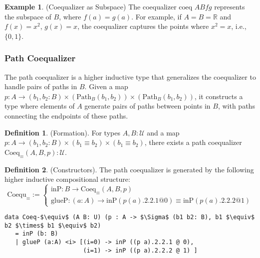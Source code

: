 \documentclass{article}
\theoremstyle{definition}
\newtheorem{definition}{Definition}
\newtheorem{example}{Example}
\begin{document}
\begin{example} (Coequalizer as Subspace)
The coequalizer \( \text{coeq } A B f g \) represents the subspace
of \( B \), where \( f(a) = g(a) \). For example, if \( A = B = \mathbb{R} \)
and \( f(x) = x^2 \), \( g(x) = x \), the coequalizer captures the points
where \( x^2 = x \), i.e., \( \{0, 1\} \).
\end{example}

\newpage
\subsubsection*{Path Coequalizer}
The path coequalizer is a higher inductive type that generalizes
the coequalizer to handle pairs of paths in \( B \). Given
a map \( p : A \to (b_1, b_2 : B) \times (\text{Path}_B (b_1, b_2)) \times (\text{Path}_B (b_1, b_2)) \),
it constructs a type where elements of \( A \) generate pairs
of paths between points in \( B \), with paths connecting
the endpoints of these paths.

\begin{definition} (Formation).
For types \( A, B : \mathcal{U} \) and a map \( p : A \to (b_1, b_2 : B) \times (b_1 \equiv b_2) \times (b_1 \equiv b_2) \),
there exists a path coequalizer \( \text{Coeq}_\equiv(A,B,p) : \mathcal{U} \).
\end{definition}

\begin{definition} (Constructors).
The path coequalizer is generated by the following higher inductive compositional structure:
\[
\text{Coequ}_\equiv :=
\begin{cases}
\text{inP} : B \to \text{Coeq}_\equiv(A,B,p) \\
\text{glueP} : (a : A) \to \text{inP}(p(a).2.2.1 @ 0) \equiv \text{inP}(p(a).2.2.2 @ 1)
\end{cases}
\]
\begin{lstlisting}[mathescape=true]
data Coeq-$\equiv$ (A B: U) (p : A -> $\Sigma$ (b1 b2: B), b1 $\equiv$ b2 $\times$ b1 $\equiv$ b2)
   = inP (b: B)
   | glueP (a:A) <i> [(i=0) -> inP ((p a).2.2.1 @ 0),
                      (i=1) -> inP ((p a).2.2.2 @ 1) ]
\end{lstlisting}
\end{definition}
\end{document}
